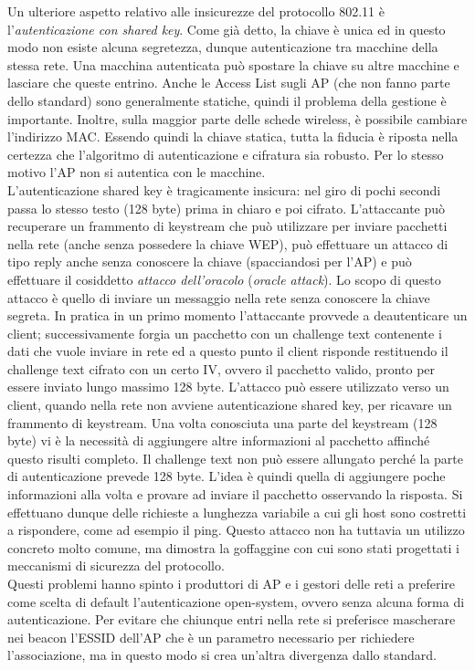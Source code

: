 Un ulteriore aspetto relativo alle insicurezze del protocollo 802.11 è l'\textit{autenticazione con shared key}. Come già detto, la chiave è unica ed in questo modo non esiste alcuna segretezza, dunque autenticazione tra macchine della stessa rete. Una macchina autenticata può spostare la chiave su altre macchine e lasciare che queste entrino. Anche le Access List sugli AP (che non fanno parte dello standard) sono generalmente statiche, quindi il problema della gestione è importante. Inoltre, sulla maggior parte delle schede wireless, è possibile cambiare l'indirizzo MAC. Essendo quindi la chiave statica, tutta la fiducia è riposta nella certezza che l'algoritmo di autenticazione e cifratura sia robusto. Per lo stesso motivo l'AP non si autentica con le macchine.\\
L'autenticazione shared key è tragicamente insicura: nel giro di pochi secondi passa lo stesso testo (128 byte) prima in chiaro e poi cifrato. L'attaccante può recuperare un frammento di keystream che può utilizzare per inviare pacchetti nella rete (anche senza possedere la chiave WEP), può effettuare un attacco di tipo reply anche senza conoscere la chiave (spacciandosi per l'AP) e può effettuare il cosiddetto \textit{attacco dell'oracolo} (\textit{oracle attack}). Lo scopo di questo attacco è quello di inviare un messaggio nella rete senza conoscere la chiave segreta. In pratica in un primo momento l'attaccante provvede a deautenticare un client; successivamente forgia un pacchetto con un challenge text contenente i dati che vuole inviare in rete ed a questo punto il client risponde restituendo il challenge text cifrato con un certo IV, ovvero il pacchetto valido, pronto per essere inviato lungo massimo 128 byte. L'attacco può essere utilizzato verso un client, quando nella rete non avviene autenticazione shared key, per ricavare un frammento di keystream. Una volta conosciuta una parte del keystream (128 byte) vi è la necessità di aggiungere altre informazioni al pacchetto affinché questo risulti completo. Il challenge text non può essere allungato perché la parte di autenticazione prevede 128 byte. L'idea è quindi quella di aggiungere poche informazioni alla volta e provare ad inviare il pacchetto osservando la risposta. Si effettuano dunque delle richieste a lunghezza variabile a cui gli host sono costretti a rispondere, come ad esempio il ping. Questo attacco non ha tuttavia un utilizzo concreto molto comune, ma dimostra la goffaggine con cui sono stati progettati i meccanismi di sicurezza del protocollo.\\
Questi problemi hanno spinto i produttori di AP e i gestori delle reti a preferire come scelta di default l'autenticazione open-system, ovvero senza alcuna forma di autenticazione. Per evitare che chiunque entri nella rete si preferisce mascherare nei beacon l'ESSID dell'AP che è un parametro necessario per richiedere l'associazione, ma in questo modo si crea un'altra divergenza dallo standard.

